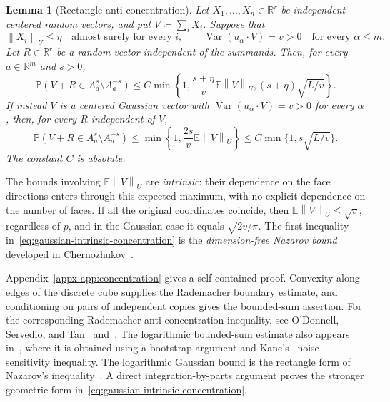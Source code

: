 \documentclass[11pt,letterpaper]{article}
\newtheorem{lemma}{Lemma}
\theoremstyle{remark}
\newcommand{\E}{\mathbb E}
\newcommand{\Pp}{\mathbb P}
\newcommand{\R}{\mathbb R}
\newcommand{\Var}{\operatorname{Var}}
\newcommand{\norm}[1]{\left\lVert#1\right\rVert}
\begin{document}
\begin{lemma}[Rectangle anti-concentration]\label{lem:concentration}
Let \(X_1,\ldots,X_n\in\R^r\) be independent centered random
vectors, and put \(V\coloneqq\sum_iX_i\). Suppose that
\[
 \norm{X_i}_U\le\eta\quad\text{almost surely for every }i,
 \qquad \Var(u_\alpha\cdot V)=v>0
                   \quad\text{for every }\alpha\le m.
\]
Let \(R\in\R^r\) be a random vector independent of the summands.
Then, for every \(a\in\R^m\) and \(s>0\),
\begin{equation}
 \Pp(V+R\in A_a^s\setminus A_a^{-s})
 \le C\min\left\{1,\frac{s+\eta}{v}\E\norm{V}_U,
                         (s+\eta)\sqrt{L/v}\right\}.
 \label{eq:bounded-intrinsic-concentration}
\end{equation}
If instead \(V\) is a centered Gaussian vector with
\(\Var(u_\alpha\cdot V)=v>0\) for every \(\alpha\), then, for
every \(R\) independent of \(V\),
\begin{equation}
 \Pp(V+R\in A_a^s\setminus A_a^{-s})
 \le\min\left\{1,\frac{2s}{v}\E\norm{V}_U\right\}
 \le C\min\{1,s\sqrt{L/v}\}.
 \label{eq:gaussian-intrinsic-concentration}
\end{equation}
The constant \(C\) is absolute.
\end{lemma}
The bounds involving \(\E\norm{V}_U\) are \emph{intrinsic}:
their dependence on the face directions enters through this expected
maximum, with no explicit dependence on the number of faces.
If all the original coordinates coincide, then
\(\E\norm{V}_U\le\sqrt v\), regardless of \(p\), and in the
Gaussian case it equals \(\sqrt{2v/\pi}\).
The first inequality in~\eqref{eq:gaussian-intrinsic-concentration}
is the \emph{dimension-free Nazarov bound} developed in
Chernozhukov~\cite{ChernozhukovAC2026}.

Appendix~\ref{appx-app:concentration} gives a self-contained proof.
Convexity along edges of the discrete cube supplies the Rademacher
boundary estimate, and conditioning on pairs of independent copies
gives the bounded-sum assertion. For the corresponding Rademacher
anti-concentration inequality, see O'Donnell, Servedio, and
Tan~\cite{OST} and~\cite[Lemma~J.4]{CCKK2022}. The logarithmic bounded-sum
estimate also appears in~\cite[Lemma~2.1]{AL}, where it is obtained
using a bootstrap argument and Kane's~\cite{Kane} noise-sensitivity
inequality. The logarithmic Gaussian bound is the rectangle form of
Nazarov's inequality~\cite[Lemma~A.1]{CCK2017}. A direct
integration-by-parts argument proves the stronger geometric form
in~\eqref{eq:gaussian-intrinsic-concentration}.
\end{document}
